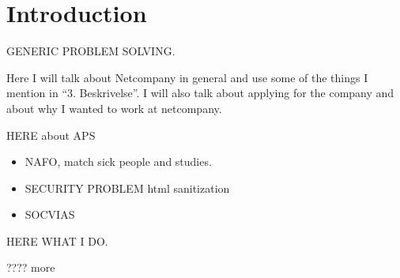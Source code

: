 \documentclass[../main.tex]{subfiles}
\begin{document}
\section{Introduction}

GENERIC PROBLEM SOLVING.  

Here I will talk about Netcompany in general and use some of the things I mention in “3. Beskrivelse”. I will also talk about applying for the company and about why I wanted to work at netcompany.  

HERE about APS 

\begin{itemize}
    \item NAFO, match sick people and studies. 
    \item SECURITY PROBLEM html sanitization 
    \item SOCVIAS 
\end{itemize}
HERE WHAT I DO. 


    ???? more 
\end{document}
